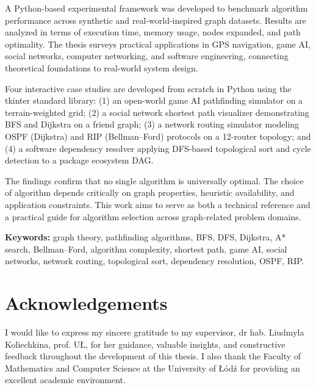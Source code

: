 \documentclass[12pt, a4paper, oneside]{report}
\theoremstyle{definition}
\begin{document}
A Python-based experimental framework was developed to benchmark algorithm performance across synthetic and real-world-inspired graph datasets. Results are analyzed in terms of execution time, memory usage, nodes expanded, and path optimality. The thesis surveys practical applications in GPS navigation, game AI, social networks, computer networking, and software engineering, connecting theoretical foundations to real-world system design.

Four interactive case studies are developed from scratch in Python using the tkinter standard library: (1) an open-world game AI pathfinding simulator on a terrain-weighted grid; (2) a social network shortest path visualizer demonstrating BFS and Dijkstra on a friend graph; (3) a network routing simulator modeling OSPF (Dijkstra) and RIP (Bellman–Ford) protocols on a 12-router topology; and (4) a software dependency resolver applying DFS-based topological sort and cycle detection to a package ecosystem DAG.

The findings confirm that no single algorithm is universally optimal. The choice of algorithm depends critically on graph properties, heuristic availability, and application constraints. This work aims to serve as both a technical reference and a practical guide for algorithm selection across graph-related problem domains.

\bigskip
\noindent\textbf{Keywords:} graph theory, pathfinding algorithms, BFS, DFS, Dijkstra, A* search, Bellman–Ford, algorithm complexity, shortest path, game AI, social networks, network routing, topological sort, dependency resolution, OSPF, RIP.

\chapter*{Acknowledgements}

I would like to express my sincere gratitude to my supervisor, dr hab. Liudmyla Koliechkina, prof. UŁ, for her guidance, valuable insights, and constructive feedback throughout the development of this thesis. I also thank the Faculty of Mathematics and Computer Science at the University of Łódź for providing an excellent academic environment.

\tableofcontents
\listoffigures
\listoftables

\setcounter{page}{1}
\end{document}
